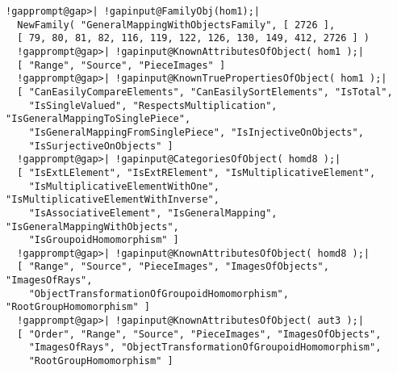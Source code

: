 \documentclass[a4paper,11pt]{report}
\begin{document}
{{\begin{Verbatim}[commandchars=!@|,fontsize=\small,frame=single,label=Example]
  !gapprompt@gap>| !gapinput@FamilyObj(hom1);|
  NewFamily( "GeneralMappingWithObjectsFamily", [ 2726 ], 
  [ 79, 80, 81, 82, 116, 119, 122, 126, 130, 149, 412, 2726 ] )
  !gapprompt@gap>| !gapinput@KnownAttributesOfObject( hom1 );|
  [ "Range", "Source", "PieceImages" ]
  !gapprompt@gap>| !gapinput@KnownTruePropertiesOfObject( hom1 );|
  [ "CanEasilyCompareElements", "CanEasilySortElements", "IsTotal", 
    "IsSingleValued", "RespectsMultiplication", "IsGeneralMappingToSinglePiece",
    "IsGeneralMappingFromSinglePiece", "IsInjectiveOnObjects", 
    "IsSurjectiveOnObjects" ]
  !gapprompt@gap>| !gapinput@CategoriesOfObject( homd8 );|
  [ "IsExtLElement", "IsExtRElement", "IsMultiplicativeElement", 
    "IsMultiplicativeElementWithOne", "IsMultiplicativeElementWithInverse", 
    "IsAssociativeElement", "IsGeneralMapping", "IsGeneralMappingWithObjects", 
    "IsGroupoidHomomorphism" ]
  !gapprompt@gap>| !gapinput@KnownAttributesOfObject( homd8 );|
  [ "Range", "Source", "PieceImages", "ImagesOfObjects", "ImagesOfRays", 
    "ObjectTransformationOfGroupoidHomomorphism", "RootGroupHomomorphism" ]
  !gapprompt@gap>| !gapinput@KnownAttributesOfObject( aut3 );|
  [ "Order", "Range", "Source", "PieceImages", "ImagesOfObjects", 
    "ImagesOfRays", "ObjectTransformationOfGroupoidHomomorphism", 
    "RootGroupHomomorphism" ]
  
\end{Verbatim}
 }

 }

          
\end{document}

